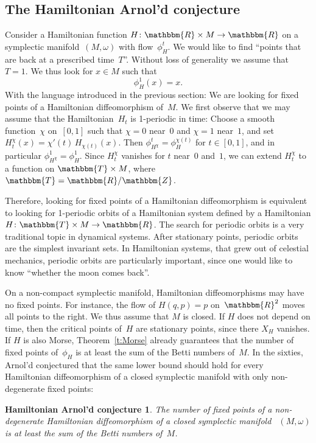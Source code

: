 \documentclass[12pt,twoside]{amsart}
\theoremstyle{plain}
\newtheorem{Arnold.Ham}[theorem]{Hamiltonian Arnol'd conjecture}
\numberwithin{figure}{section}
\numberwithin{equation}{section}
\def\go{\omega}
\def\RR{\mathbbm{R}}
\def\TT{\mathbbm{T}}
\def\ZZ{\mathbbm{Z}}
\begin{document}
\subsection{The Hamiltonian Arnol'd conjecture} \label{s:hamiltonian}
Consider a Hamiltonian function $H \colon \RR \times M \to \RR$ on a symplectic manifold~$(M,\go)$ with flow~$\phi_H^t$.
We would like to find ``points that are back at a prescribed time~$T$''.
Without loss of generality we assume that~$T=1$.
We thus look for $x \in M$ such that 
%
\[
\phi_H^1(x) = x .
\]
With the language introduced in the previous section: We are looking for fixed points of a Hamiltonian diffeomorphism of~$M$. We first observe that we may assume that the Hamiltonian~$H_t$ 
is 1-periodic in time: Choose a  smooth function~$\chi$ on~$[0,1]$ such that $\chi =0$ near~$0$ and $\chi =1$ near~$1$,
and set $H_t^\chi(x) = \chi'(t) \, H_{\chi (t)}(x)$. 
Then $\phi_{H^{\chi}}^t = \phi_{H}^{\chi(t)}$ for $t \in [0,1]$, 
and in particular $\phi_{H^{\chi}}^1 = \phi_{H}^1$. 
Since $H_t^\chi$ vanishes for $t$ near~$0$ and~$1$, 
we can extend $H_t^\chi$ to a function on $\TT \times M$, where $\TT = \RR/\ZZ$.

Therefore, looking for fixed points of a Hamiltonian diffeomorphism is equivalent to looking for 1-periodic orbits of a Hamiltonian system defined by a Hamiltonian $H \colon \TT \times M \to \RR$. 
The search for periodic orbits is a very traditional topic in dynamical systems. 
After stationary points, periodic orbits are the simplest invariant sets. 
In Hamiltonian systems, that grew out of celestial mechanics, periodic orbits are particularly 
important, 
since one would like to know ``whether the moon comes back''.

On a non-compact symplectic manifold, Hamiltonian diffeomorphisms may have no fixed points. 
For instance, the flow of $H(q,p) = p$ on~$\RR^2$ moves all points to the right. 
We thus assume that $M$ is closed. 
If $H$ does not depend on time, then the critical points of~$H$ are stationary points, 
since there $X_H$ vanishes. If $H$ is also Morse, Theorem~\ref{t:Morse} already guarantees that 
the number of fixed points of~$\phi_H$ is at least the sum of the Betti numbers of~$M$. 
In the sixties, Arnol'd conjectured that the same lower bound should hold for every Hamiltonian diffeomorphism of a closed symplectic manifold with only non-degenerate fixed points:

\begin{Arnold.Ham} 
\label{arnold}
The number of fixed points of a non-degenerate Hamiltonian diffeomorphism 
of a closed symplectic manifold~ $(M,\omega)$ is at least the sum of the Betti numbers of~$M$.
\end{Arnold.Ham}
\end{document}
